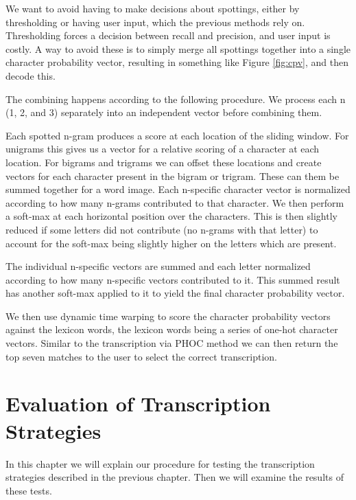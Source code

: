 \documentclass[ms,electronic,twosidetoc,letterpaper,chaptercenter,parttop,lof,lot]{byumsphd}
\begin{document}
We want to avoid having to make decisions about spottings, either by thresholding or having user input, which the previous methods rely on. Thresholding forces a decision between recall and precision, and user input is costly. A way to avoid these is to simply merge all spottings together into a single character probability vector, resulting in something like Figure \ref{fig:cpv}, and then decode this.



The combining happens according to the following procedure.
We process each n (1, 2, and 3) separately into an independent vector before combining them.

Each spotted n-gram produces a score at each location of the sliding window. For unigrams this gives us a vector for a relative scoring of a character at each location. For bigrams and trigrams we can offset these locations and create vectors for each character present in the bigram or trigram. These can them be summed together for a word image.
Each n-specific character vector is normalized according to how many n-grams contributed to that character.
We then perform a soft-max at each horizontal position over the characters. This is then slightly reduced if some letters did not contribute (no n-grams with that letter) to account for the soft-max being slightly higher on the letters which are present.

The individual n-specific vectors are summed and each letter normalized according to how many n-specific vectors contributed to it.
This summed result has another soft-max applied to it to yield the final character probability vector.

We then use dynamic time warping to score the character probability vectors against the lexicon words, the lexicon words being a series of one-hot character vectors. Similar to the transcription via PHOC method we can then return the top seven matches to the user to select the correct transcription.




\chapter{Evaluation of Transcription Strategies}

In this chapter we will explain our procedure for testing the transcription strategies described in the previous chapter. Then we will examine the results of these tests.
\end{document}
